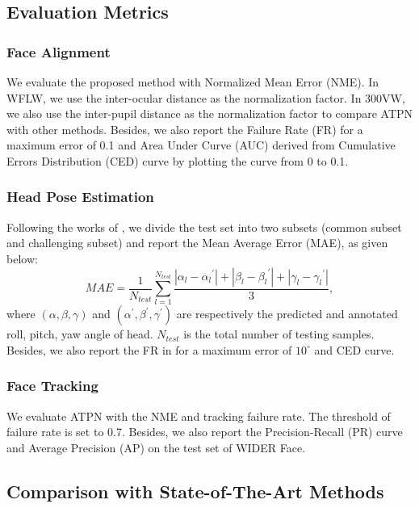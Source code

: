 \documentclass[3p,twocolumn, round, sort & compress]{elsarticle}
\begin{document}
\subsection{Evaluation Metrics}
\subsubsection{Face Alignment}
We evaluate the proposed method with Normalized Mean Error (NME). In WFLW, we use the inter-ocular distance \citep{300W} as the normalization factor. In 300VW, we also use the inter-pupil distance \citep{LAB} as the normalization factor to compare ATPN with other methods. Besides, we also report the Failure Rate (FR) for a maximum error of 0.1 and Area Under Curve (AUC) derived from Cumulative Errors Distribution (CED) curve by plotting the curve from 0 to 0.1.

\subsubsection{Head Pose Estimation}
Following the works of \citep{LAB,PropNet}, we divide the test set into two subsets (common subset and challenging subset) and report the Mean Average Error (MAE), as given below:
\begin{equation}
MAE = \frac{1}{{{N_{test}}}}\sum\limits_{l = 1}^{N{}_{test}} {\frac{{\left| {{\alpha _l} - {\alpha _l}^\prime } \right| + \left| {{\beta _l} - {\beta _l}^\prime } \right| + \left| {{\gamma _l} - {\gamma _l}^\prime } \right|}}{3}},
\end{equation}
where $(\alpha,\beta,\gamma)$ and $(\alpha^\prime,\beta^\prime,\gamma^\prime)$ are respectively the predicted and annotated roll, pitch, yaw angle of head. $N_{test}$ is the total number of testing samples. Besides, we also report the FR in for a maximum error of $10^\circ$ and CED curve.
\subsubsection{Face Tracking}
We evaluate ATPN with the NME and tracking failure rate. The threshold of failure rate is set to 0.7. Besides, we also report the Precision-Recall (PR) curve and Average Precision (AP) on the test set of WIDER Face.


\subsection{Comparison with State-of-The-Art Methods}
\end{document}
